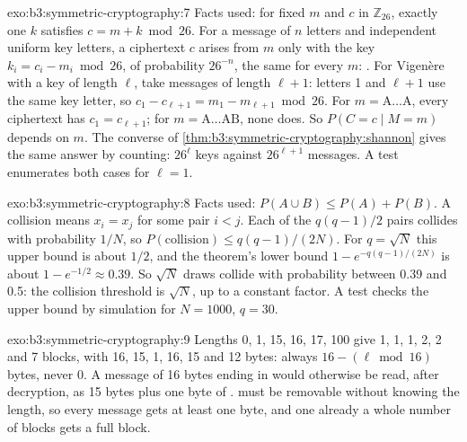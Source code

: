 \begin{solution}{exo:b3:symmetric-cryptography:7}
Facts used: for fixed $m$ and $c$ in $\mathbb{Z}_{26}$, exactly one $k$ satisfies $c = m + k \bmod 26$. For a message of $n$ letters and independent uniform key letters, a ciphertext $c$ arises from $m$ only with the key $k_i = c_i - m_i \bmod 26$, of probability $26^{-n}$, the same for every $m$: . For Vigenère with a key of length $\ell$, take messages of length $\ell + 1$: letters 1 and $\ell + 1$ use the same key letter, so $c_1 - c_{\ell+1} = m_1 - m_{\ell+1} \bmod 26$. For $m = \mathrm{A}\ldots\mathrm{A}$, every ciphertext has $c_1 = c_{\ell+1}$; for $m = \mathrm{A}\ldots\mathrm{AB}$, none does. So $P(C = c \mid M = m)$ depends on $m$. The converse of \cref{thm:b3:symmetric-cryptography:shannon} gives the same answer by counting: $26^\ell$ keys against $26^{\ell+1}$ messages. A test enumerates both cases for $\ell = 1$.
\end{solution}

\begin{solution}{exo:b3:symmetric-cryptography:8}
Facts used: $P(A \cup B) \le P(A) + P(B)$. A collision means $x_i = x_j$ for some pair $i < j$. Each of the $q(q - 1)/2$ pairs collides with probability $1/N$, so $P(\text{collision}) \le q(q - 1)/(2N)$. For $q = \sqrt{N}$ this upper bound is about $1/2$, and the theorem's lower bound $1 - e^{-q(q-1)/(2N)}$ is about $1 - e^{-1/2} \approx 0.39$. So $\sqrt{N}$ draws collide with probability between 0.39 and 0.5: the collision threshold is $\sqrt{N}$, up to a constant factor. A test checks the upper bound by simulation for $N = 1000$, $q = 30$.
\end{solution}

\begin{solution}{exo:b3:symmetric-cryptography:9}
Lengths 0, 1, 15, 16, 17, 100 give 1, 1, 1, 2, 2 and 7 blocks, with 16, 15, 1, 16, 15 and 12  bytes: always $16 - (\ell \bmod 16)$ bytes, never 0. A message of 16 bytes ending in  would otherwise be read, after decryption, as 15 bytes plus one byte of .  must be removable without knowing the length, so every message gets at least one  byte, and one already a whole number of blocks gets a full block.
\end{solution}

